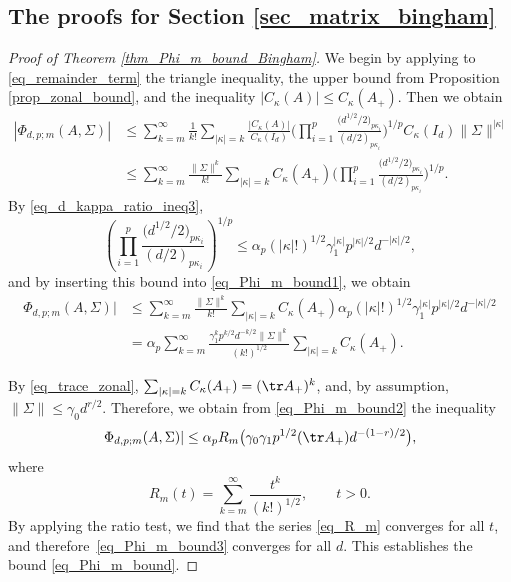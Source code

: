 \subsection[The proofs for Section 2]{The proofs for Section \ref{sec_matrix_bingham}}
\label{sec_proofs_Phi_bounds}

\begin{proof}[Proof of Theorem \ref{thm_Phi_m_bound_Bingham}]
We begin by applying to \eqref{eq_remainder_term} the triangle inequality, the upper bound from Proposition \ref{prop_zonal_bound}, and the inequality $|C_\kappa(A)| \le C_\kappa(A_+)$. Then we obtain
\begin{align}
\label{eq_Phi_m_bound1}
|\Phi_{d,p;m}(A,\Sigma)| &\le \sum_{k=m}^\infty \frac{1}{k!} \sum_{|\kappa|=k} \frac{|C_\kappa(A)|}{C_\kappa(I_d)} \Bigg(\prod_{i=1}^p \frac{\bigl(d^{1/2}/2\bigr)_{p \kappa_i}}{(d/2)_{p \kappa_i}}\Bigg)^{1/p} C_\kappa(I_d) \|\Sigma\|^{|\kappa|} \nonumber \\
&\le \sum_{k=m}^\infty \frac{\|\Sigma\|^k}{k!} \sum_{|\kappa|=k} C_\kappa(A_+) \Bigg(\prod_{i=1}^p \frac{\bigl(d^{1/2}/2\bigr)_{p \kappa_i}}{(d/2)_{p \kappa_i}}\Bigg)^{1/p}.
\end{align}
By \eqref{eq_d_kappa_ratio_ineq3},
\[
\left(\prod_{i=1}^p \frac{\bigl(d^{1/2}/2\bigr)_{p \kappa_i}}{(d/2)_{p \kappa_i}}\right)^{1/p} \le \alpha_p (|\kappa|!)^{1/2} \gamma_1^{|\kappa|} p^{|\kappa|/2} d^{-|\kappa|/2},
\]
and by inserting this bound into \eqref{eq_Phi_m_bound1}, we obtain
\begin{align}
\label{eq_Phi_m_bound2}
\Phi_{d,p;m}(A,\Sigma)| &\le \sum_{k=m}^\infty \frac{\|\Sigma\|^k}{k!} \sum_{|\kappa|=k} C_\kappa(A_+) \alpha_p (|\kappa|!)^{1/2} \gamma_1^{|\kappa|} p^{|\kappa|/2} d^{-|\kappa|/2} \nonumber \\
&= \alpha_p \sum_{k=m}^\infty \frac{\gamma_1^k p^{k/2} d^{-k/2} \|\Sigma\|^k}{(k!)^{1/2}} \sum_{|\kappa|=k} C_\kappa(A_+).
\end{align}

By \eqref{eq_trace_zonal},
$
\sum_{|\kappa|=k} C_\kappa(A_+) = (\tr A_+)^k$,
and, by assumption, $\|\Sigma\| \le \gamma_0 d^{r/2}$. Therefore, we obtain from \eqref{eq_Phi_m_bound2} the inequality
\begin{equation}
\label{eq_Phi_m_bound3}
\Phi_{d,p;m}(A,\Sigma)| \le \alpha_p R_m\bigl(\gamma_0 \gamma_1 p^{1/2} (\tr A_+) d^{-(1-r)/2}\bigr),
\end{equation}
where
\begin{equation}
\label{eq_R_m}
R_m(t) = \sum_{k=m}^\infty \frac{t^k}{(k!)^{1/2}},\qquad t > 0.
\end{equation}
By applying the ratio test, we find that the series \eqref{eq_R_m} converges for all $t$, and therefore~\eqref{eq_Phi_m_bound3} converges for all $d$. This establishes the bound \eqref{eq_Phi_m_bound}.


\end{proof}
